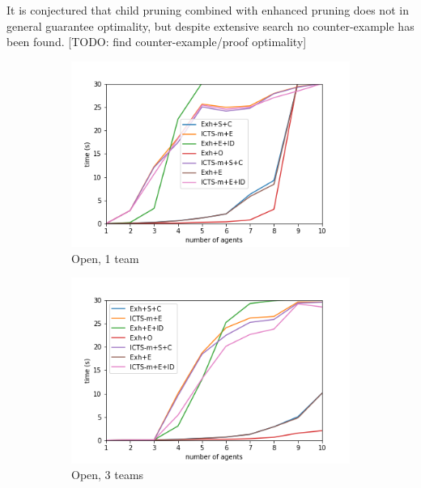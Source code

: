 \documentclass[english]{article}
\begin{document}
	It is conjectured that child pruning combined with enhanced pruning does not in general guarantee optimality, but despite extensive search no counter-example has been found. [TODO: find counter-example/proof optimality]
	\begin{figure}
		\centering
		\begin{subfigure}{0.49\textwidth}
			\centering
			\includegraphics[width=\linewidth]{img/results/open-1}
			\caption{Open, 1 team}
			\label{fig:open1}
		\end{subfigure}
		\begin{subfigure}{0.49\textwidth}
			\centering
			\includegraphics[width=\linewidth]{img/results/open-3}
			\caption{Open, 3 teams}
			\label{fig:open3}
		\end{subfigure}
		\begin{subfigure}{0.49\textwidth}
			\centering

\end{subfigure}
\end{figure}
\end{document}
